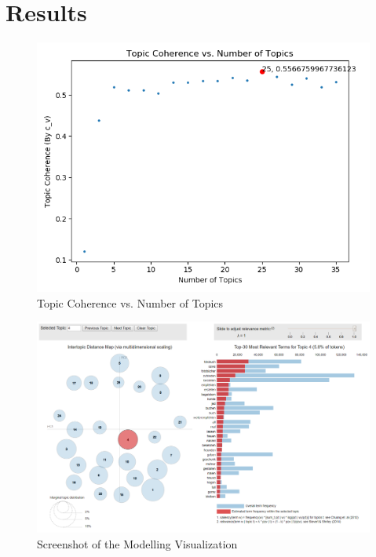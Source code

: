 \documentclass{article} %
\begin{document}
\section{Results}
\begin{figure}[H]
      \graphicspath{ {images/} }
      \begin{center}
      \includegraphics[scale=0.8]{coherence.png}
      \end{center}
      \caption{Topic Coherence vs. Number of Topics}
\end{figure}

\begin{figure}[H]
      \graphicspath{ {images/} }
      \begin{center}
      \includegraphics[scale=0.65, angle=-90]{vis_result.png}
      \end{center}
      \caption{Screenshot of the Modelling Visualization}
\end{figure}
\newpage
\end{document}

